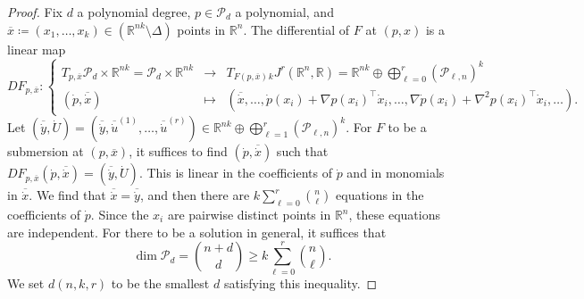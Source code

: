 \documentclass{amsart}
\newcommand{\R}{\mathbb{R}}
\newcommand{\Poly}{\mathscr{P}}
\theoremstyle{definition}
\theoremstyle{remark}
\begin{document}
\begin{proof}
Fix $d$ a polynomial degree, $p \in \Poly_d$ a polynomial, and $\overline{x} \coloneqq (x_1, \ldots, x_k) \in (\R^{nk} \setminus \Delta)$ points in $\R^n$. The differential of $F$ at $(p, x)$ is a linear map
\[
DF_{p, \overline{x}} \colon \left\{ \begin{array}{ccc}
T_{p, \overline{x}} \Poly_d \times \R^{nk} = \Poly_d \times \R^{nk} & \to & T_{F(p, \overline{x})} {}_k J^r(\R^n, \R) = \R^{nk} \oplus \bigoplus_{\ell = 0}^r (\Poly_{\ell, n})^k \\
(\dot{p}, \overline{\dot{x}}) & \mapsto & (\overline{\dot{x}}, \ldots, \dot{p}(x_i) + \nabla p(x_i)^\top \dot{x}_i, \ldots, \nabla \dot{p}(x_i) + \nabla^2 p(x_i)^\top \dot{x}_i, \ldots).
\end{array} \right.
\]
Let $(\overline{\dot{y}}, \dot{U}) = (\overline{\dot{y}}, \overline{\dot{u}}^{(1)}, \ldots, \overline{\dot{u}}^{(r)}) \in \R^{nk} \oplus \bigoplus_{\ell = 1}^r (\Poly_{\ell, n})^k$. For $F$ to be a submersion at $(p, \overline{x})$, it suffices to find $(\dot{p}, \overline{\dot{x}})$ such that $DF_{p, \overline{x}}(\dot{p}, \overline{\dot{x}}) = (\overline{\dot{y}}, \dot{U})$. This is linear in the coefficients of $\dot{p}$ and in monomials in $\overline{\dot{x}}$. We find that $\overline{\dot{x}} = \overline{\dot{y}}$, and then there are $k \sum_{\ell = 0}^r \binom{n}{\ell}$ equations in the coefficients of $\dot{p}$. Since the $x_i$ are pairwise distinct points in $\R^n$, these equations are independent. For there to be a solution in general, it suffices that
\[
\dim \Poly_d = \binom{n + d}{d} \geq k \sum_{\ell = 0}^r \binom{n}{\ell}.
\]
We set $d(n, k, r)$ to be the smallest $d$ satisfying this inequality.
\end{proof}
\end{document}
